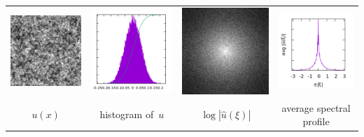 \begin{tabular}{cccc}
	\includegraphics{c256.png} &
	\includegraphics{c256_h.png} &
	\includegraphics{c256_f.png} &
	\includegraphics{c256_p.png} \\
	$u(x)$ &
	histogram of~$u$ &
	$\log|\hat u(\xi)|$ &
	average spectral profile
\end{tabular}
